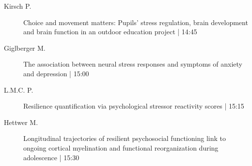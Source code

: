 \begin{symposium}
\begin{description}
                \item [ Kirsch P.] Choice and movement matters: Pupils' stress regulation, brain development and brain function in an outdoor education project  \textcolor{mygray}{ | 14:45}    
                
                \item [ Giglberger M.] The association between neural stress responses and symptoms of anxiety and depression \textcolor{mygray}{ | 15:00}    
                
                \item [ L.M.C. P.] Resilience quantification via psychological stressor reactivity scores \textcolor{mygray}{ | 15:15}    
                
                \item [ Hettwer M.] Longitudinal trajectories of resilient psychosocial functioning link to ongoing cortical myelination and functional reorganization during adolescence \textcolor{mygray}{ | 15:30}    
                
            \end{description} 
            \end{symposium}
            